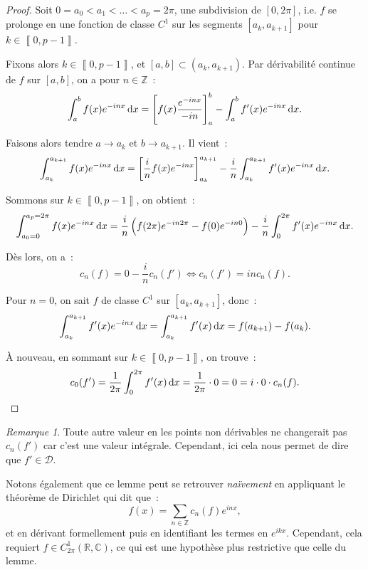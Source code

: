 \documentclass{report}
\theoremstyle{definition}
\theoremstyle{remark}
\newtheorem*{rmq}{Remarque}
\numberwithin{equation}{section}
\newcommand{\C}{\mathbb C}
\newcommand{\R}{\mathbb R}
\newcommand{\Z}{\mathbb Z}
\newcommand{\intint}[2]{\left\llbracket#1, #2\right\rrbracket}
\begin{document}
			\begin{proof} Soit $0 = a_0 < a_1 < \ldots < a_p = 2\pi$, une subdivision de $[0, 2\pi]$, i.e. $f$ se prolonge en une fonction de classe $C^1$ sur les
			segments $[a_k, a_{k+1}]$ pour $k \in \intint 0{p-1}$.

			Fixons alors $k \in \intint 0{p-1}$, et $[a, b] \subset (a_k, a_{k+1})$. Par dérivabilité continue de $f$ sur $[a, b]$, on a pour $n \in \Z$~:
			\begin{equation}
				\int_a^b f(x)e^{-inx}\dif x = \left[f(x)\frac {e^{-inx}}{-in}\right]_a^b - \int_a^b f'(x)e^{-inx}\dif x.
			\end{equation}

			Faisons alors tendre $a \to a_k$ et $b \to a_{k+1}$. Il vient~:
			\begin{equation}
				\int_{a_k}^{a_{k+1}} f(x)e^{-inx}\dif x = \left[\frac in f(x)e^{-inx}\right]_{a_k}^{a_{k+1}} - \frac in\int_{a_k}^{a_{k+1}}f'(x)e^{-inx}\dif x.
			\end{equation}

			Sommons sur $k \in \intint 0{p-1}$, on obtient~:
			\begin{equation}
				\int_{a_0=0}^{a_p=2\pi}f(x)e^{-inx}\dif x = \frac in\left(f(2\pi)e^{-in2\pi} - f(0)e^{-in0}\right) - \frac in \int_0^{2\pi}f'(x)e^{-inx}\dif x.
			\end{equation}

			Dès lors, on a~:
			\begin{equation}
				c_n(f) = 0 - \frac inc_n(f') \iff c_n(f') = inc_n(f).
			\end{equation}

			Pour $n = 0$, on sait $f$ de classe $C^1$ sur $[a_k, a_{k+1}]$, donc~:
			\begin{equation}
				\int_{a_k}^{a_{k+1}}f'(x)e^{-inx}\dif x = \int_{a_k}^{a_{k+1}}f'(x)\dif x = f(a_{k+1}) - f(a_k).
			\end{equation}

			À nouveau, en sommant sur $k \in \intint 0{p-1}$, on trouve~:
			\begin{equation}
				c_0(f') = \frac 1{2\pi}\int_0^{2\pi}f'(x)\dif x = \frac 1{2\pi} \cdot 0 = 0 = i \cdot 0 \cdot c_n(f).
			\end{equation}
			\end{proof}

			\begin{rmq} Toute autre valeur en les points non dérivables ne changerait pas $c_n(f')$ car c'est une valeur intégrale. Cependant, ici cela nous permet de
			dire que $f' \in \mathcal D$.

			Notons également que ce lemme peut se retrouver \textit{naïvement} en appliquant le théorème de Dirichlet qui dit que~:
			\begin{equation}
				f(x) = \sum_{n \in \Z}c_n(f)e^{inx},
			\end{equation}
			et en dérivant formellement puis en identifiant les termes en $e^{ikx}$. Cependant, cela requiert $f \in C^1_{2\pi}(\R, \C)$, ce qui est une hypothèse
			plus restrictive que celle du lemme.
			\end{rmq}
\end{document}
